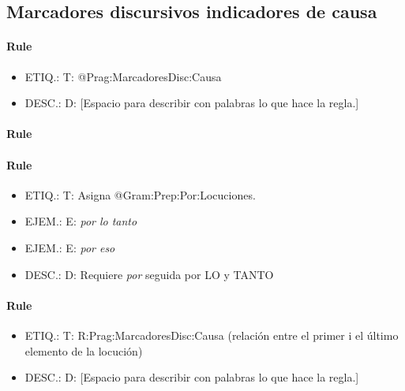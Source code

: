 \documentclass[11pt]{report}
\begin{document}
\subsection{Marcadores discursivos indicadores de causa}
\paragraph*{Rule}
\begin{itemize}
\item ETIQ.:  T: @Prag:MarcadoresDisc:Causa
\item DESC.:  D: [Espacio para describir con palabras lo que hace la regla.]
\end{itemize}

\paragraph*{Rule}
\paragraph*{Rule}
\begin{itemize}
\item ETIQ.:  T: Asigna @Gram:Prep:Por:Locuciones.
\item EJEM.:  E: \emph{por lo tanto}
\item EJEM.:  E: \emph{por eso}
\item DESC.:  D: Requiere \emph{por} seguida por LO y TANTO
\end{itemize}

\paragraph*{Rule}
\begin{itemize}
\item ETIQ.:  T: R:Prag:MarcadoresDisc:Causa (relación entre el primer i el último elemento de la locución)
\item DESC.:  D: [Espacio para describir con palabras lo que hace la regla.]
\end{itemize}
\end{document}
